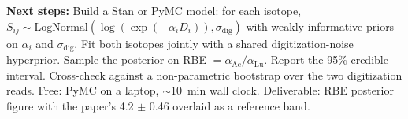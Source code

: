\textbf{Next steps:} Build a Stan or PyMC model: for each isotope,
$S_{ij} \sim \text{LogNormal}(\log(\exp(-\alpha_i D_i)), \sigma_{\text{dig}})$
with weakly informative priors on $\alpha_i$ and $\sigma_{\text{dig}}$. Fit
both isotopes jointly with a shared digitization-noise hyperprior. Sample
the posterior on RBE $= \alpha_{\text{Ac}} / \alpha_{\text{Lu}}$. Report the
95\% credible interval. Cross-check against a non-parametric bootstrap
over the two digitization reads. Free: PyMC on a laptop, $\sim$10~min wall
clock. Deliverable: RBE posterior figure with the paper's 4.2 $\pm$ 0.46
overlaid as a reference band.
